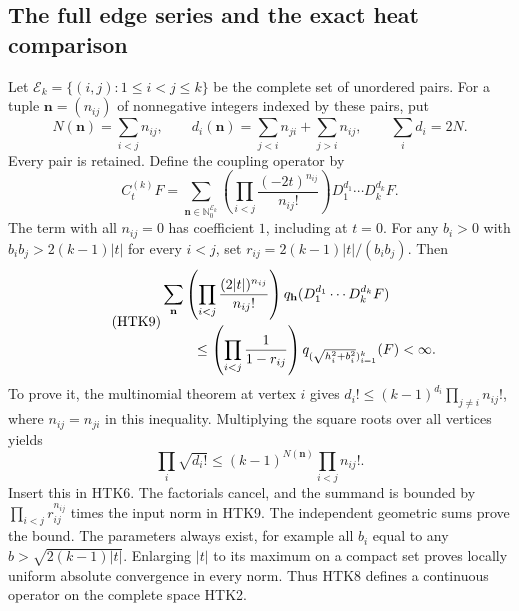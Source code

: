 \subsection{The full edge series and the exact heat comparison}

Let $\mathscr E_k=\{(i,j):1\le i<j\le k\}$ be the complete
set of unordered pairs. For a tuple $\mathbf n=(n_{ij})$ of
nonnegative integers indexed by these pairs, put
\begin{equation}\tag{HTK7}
 N(\mathbf n)=\sum_{i<j}n_{ij},\qquad
 d_i(\mathbf n)=\sum_{j<i}n_{ji}+\sum_{j>i}n_{ij},\qquad
 \sum_i d_i=2N.
\end{equation}
Every pair is retained. Define the coupling operator by
\begin{equation}\tag{HTK8}
 C_t^{(k)}F=\sum_{\mathbf n\in\mathbb N_0^{\mathscr E_k}}
    \left(\prod_{i<j}\frac{(-2t)^{n_{ij}}}{n_{ij}!}\right)
                         D_1^{d_1}\cdots D_k^{d_k}F.
\end{equation}
The term with all $n_{ij}=0$ has coefficient $1$, including
at $t=0$. For any $b_i>0$ with
$b_ib_j>2(k-1)|t|$ for every $i<j$, set
$r_{ij}=2(k-1)|t|/(b_ib_j)$. Then
\begin{equation}\tag{HTK9}
\begin{split}
 &\sum_{\mathbf n}
  \left(\prod_{i<j}\frac{(2|t|)^{n_{ij}}}{n_{ij}!}\right)
             q_{\mathbf h}(D_1^{d_1}\cdots D_k^{d_k}F)\\
 &\hspace{8mm}\le
       \left(\prod_{i<j}\frac1{1-r_{ij}}\right)
          q_{(\sqrt{h_i^2+b_i^2})_{i=1}^k}(F)<\infty.
\end{split}
\end{equation}
To prove it, the multinomial theorem at vertex $i$ gives
$d_i!\le(k-1)^{d_i}\prod_{j\ne i}n_{ij}!$, where
$n_{ij}=n_{ji}$ in this inequality. Multiplying the square
roots over all vertices yields
\[
 \prod_i\sqrt{d_i!}\le
      (k-1)^{N(\mathbf n)}\prod_{i<j}n_{ij}!.
\]
Insert this in HTK6. The factorials cancel, and the summand
is bounded by $\prod_{i<j}r_{ij}^{n_{ij}}$ times the input
norm in HTK9. The independent geometric sums prove the bound.
The parameters always exist, for example all $b_i$ equal to
any $b>\sqrt{2(k-1)|t|}$. Enlarging $|t|$ to its maximum
on a compact set proves locally uniform absolute convergence
in every norm. Thus HTK8 defines a continuous operator on the
complete space HTK2.

